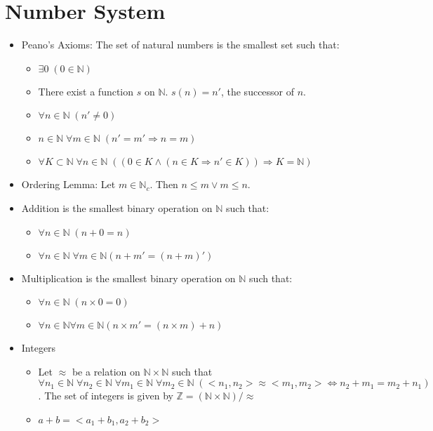 \documentclass[11pt, twocolumn]{article}
\newenvironment{compactitem}
{\begin{itemize}
  \setlength{\itemsep}{1px}
  \setlength{\parskip}{0pt}
  \setlength{\parsep}{0pt}}
{\end{itemize}}
\begin{document}
\section{Number System}
\begin{compactitem}
\item Peano's Axioms: The set of natural numbers is the smallest set such that:
\begin{compactitem}
\item $\exists 0 \; (0 \in \mathbb{N})$
\item There exist a function $s$ on $\mathbb{N}$. $s(n) = n'$, the successor of $n$.
\item $\forall n \in \mathbb{N} \;(n' \neq 0)$
\item $n \in \mathbb{N}\; \forall m \in \mathbb{N} \; (n' = m' \Rightarrow n=m)$
\item $\forall K \subset \mathbb{N} \; \forall n\in \mathbb{N} \;((0\in K \wedge (n \in K \Rightarrow n' \in K))\Rightarrow K = \mathbb{N} )$  
\end{compactitem}
\item Ordering Lemma: Let $m\in \mathbb{N}_c$. Then $n\leq m \vee m\leq n$.
\item Addition is the smallest binary operation on $\mathbb{N}$ such that:
\begin{compactitem}
\item $\forall n \in \mathbb{N} \;(n+0=n)$
\item $ \forall n\in \mathbb{N} \; \forall m\in \mathbb{N} (n+m' = (n+m)')$
\end{compactitem}
\item Multiplication is the smallest binary operation on $\mathbb{N}$ such that:
\begin{compactitem}
\item $\forall n \in \mathbb{N} \; (n\times 0 = 0)$
\item $\forall n \in \mathbb{N} \forall m \in \mathbb{N} (n\times m' = (n\times m)+n)$
\end{compactitem}
\item Integers
\begin{compactitem}
\item Let $\approx$ be a relation on $\mathbb{N} \times \mathbb{N}$ such that $\forall n_1 \in \mathbb{N} \; \forall n_2 \in \mathbb{N} \; \forall m_1 \in \mathbb{N} \; \forall m_2 \in \mathbb{N} \;(<n_1, n_2> \approx <m_1, m_2> \Leftrightarrow n_2+m_1=m_2+n_1)$. The set of integers is given by $\mathbb{Z} = (\mathbb{N} \times \mathbb{N})/\approx$
\item $a+b = <a_1+b_1, a_2+b_2>$

\end{compactitem}
\end{compactitem}
\end{document}
